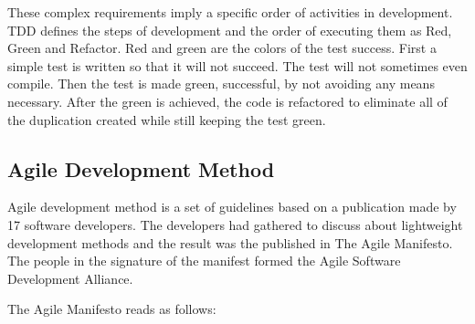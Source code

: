 These complex requirements imply a specific order of activities in development. TDD defines the steps of development and the order of executing them as Red, Green and Refactor. Red and green are the colors of the test success. First a simple test is written so that it will not succeed. The test will not sometimes even compile. Then the test is made green, successful, by not avoiding any means necessary. After the green is achieved, the code is refactored to eliminate all of the duplication created while still keeping the test green.~\cite{beck2003test}

\subsection{Agile Development Method} 
Agile development method is a set of guidelines based on a publication made by 17 software developers. The developers had gathered to discuss about lightweight development methods and the result was the published in The Agile Manifesto. The people in the signature of the manifest formed the Agile Software Development Alliance.

The Agile Manifesto reads as follows:

